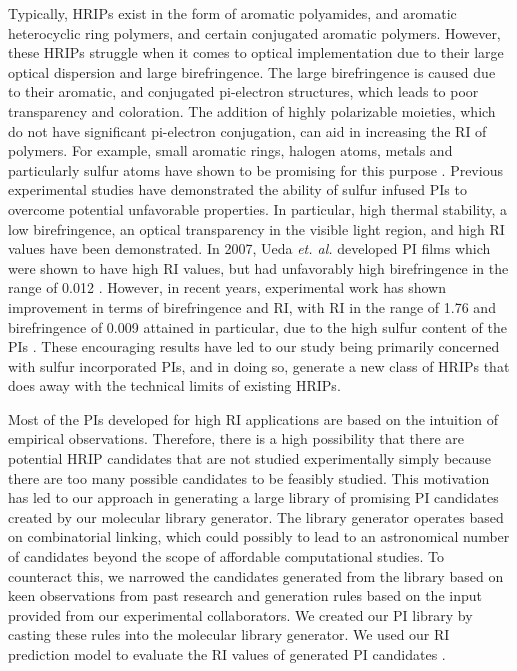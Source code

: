 
Typically, HRIPs exist in the form of aromatic polyamides, and aromatic heterocyclic ring polymers, and certain conjugated aromatic polymers. However, these HRIPs struggle when it comes to optical implementation due to their large optical dispersion and large birefringence. The large birefringence is caused due to their aromatic, and conjugated pi-electron structures, which leads to poor transparency and coloration. The addition of highly polarizable moieties, which do not have significant pi-electron conjugation, can aid in increasing the RI of polymers. For example, small aromatic rings, halogen atoms, metals and particularly sulfur atoms have shown to be promising for this purpose \citep{Tsai2016,Kobayashi1998,Liu2007a,Sawada1998}. Previous experimental studies have demonstrated the ability of sulfur infused PIs to overcome potential unfavorable properties. In particular, high thermal stability, a low birefringence, an optical transparency in the visible light region, and high RI values have been demonstrated. In 2007, Ueda \textit{et. al.} developed PI films which were shown to have high RI values, but had unfavorably high birefringence in the range of 0.012 \cite{Liu2007b}. However, in recent years, experimental work has shown improvement in terms of birefringence and RI, with RI in the range of 1.76 and birefringence of 0.009 attained in particular, due to the high sulfur content of the PIs \cite{Yeo2015}. These encouraging results have led to our study being primarily concerned with sulfur incorporated PIs, and in doing so, generate a new class of HRIPs that does away with the technical limits of existing HRIPs.

Most of the PIs developed for high RI applications are based on the intuition of empirical observations. Therefore, there is a high possibility that there are potential HRIP candidates that are not studied experimentally simply because there are too many possible candidates to be feasibly studied. This motivation has led to our approach in generating a large library of promising PI candidates created by our molecular library generator. The library generator operates based on combinatorial linking, which could possibly to lead to an astronomical number of candidates beyond the scope of affordable computational studies. To counteract this, we narrowed the candidates generated from the library based on keen observations from past research and generation rules based on the input provided from our experimental collaborators. We created our PI library by casting these rules into the molecular library generator. We used our RI prediction model to evaluate the RI values of generated PI candidates \cite{Afzal2018a}.

